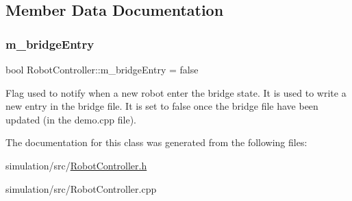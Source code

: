 \subsection{Member Data Documentation}
\mbox{\label{class_robot_controller_abe09204acb8936eddcacbae0b023423a}} 
\subsubsection{\texorpdfstring{m\+\_\+bridge\+Entry}{m\_bridgeEntry}}
{\footnotesize\ttfamily bool Robot\+Controller\+::m\+\_\+bridge\+Entry = false}

Flag used to notify when a new robot enter the bridge state. It is used to write a new entry in the bridge file. It is set to false once the bridge file have been updated (in the demo.\+cpp file). 

The documentation for this class was generated from the following files\+:\begin{DoxyCompactItemize}
\item 
simulation/src/\mbox{\hyperlink{_robot_controller_8h}{Robot\+Controller.\+h}}\item 
simulation/src/Robot\+Controller.\+cpp\end{DoxyCompactItemize}
